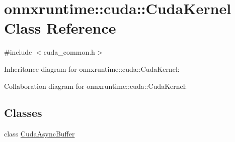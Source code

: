 \hypertarget{classonnxruntime_1_1cuda_1_1CudaKernel}{}\section{onnxruntime\+:\+:cuda\+:\+:Cuda\+Kernel Class Reference}
\label{classonnxruntime_1_1cuda_1_1CudaKernel}


{\ttfamily \#include $<$cuda\+\_\+common.\+h$>$}



Inheritance diagram for onnxruntime\+:\+:cuda\+:\+:Cuda\+Kernel\+:


Collaboration diagram for onnxruntime\+:\+:cuda\+:\+:Cuda\+Kernel\+:
\subsection*{Classes}
\begin{DoxyCompactItemize}
\item 
class \mbox{\hyperlink{classonnxruntime_1_1cuda_1_1CudaKernel_1_1CudaAsyncBuffer}{Cuda\+Async\+Buffer}}
\end{DoxyCompactItemize}
